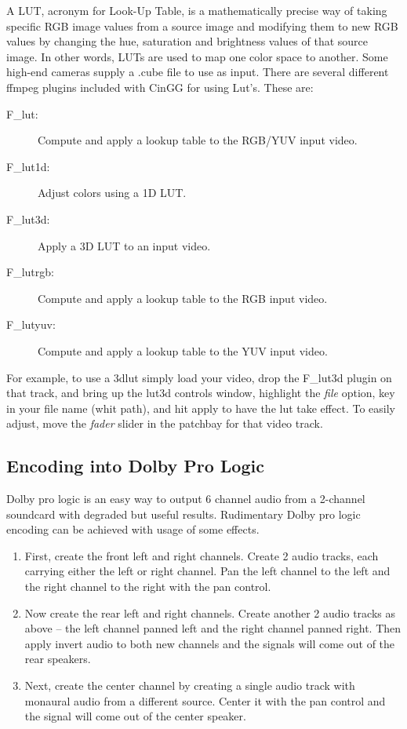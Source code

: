 A LUT, acronym for Look-Up Table, is a mathematically precise way of taking specific RGB image values from a source image and modifying them to new RGB values by changing the hue, saturation and brightness values of that source image. In other words, LUTs are used to map one color space to another.  Some high-end cameras supply a .cube file to use as input. There are several different ffmpeg plugins included with CinGG for using Lut's.  These are:

\begin{description}
	\item[F\_lut:] Compute and apply a lookup table to the RGB/YUV input video.
	\item[F\_lut1d:] Adjust colors using a 1D LUT.
	\item[F\_lut3d:] Apply a 3D LUT to an input video.
	\item[F\_lutrgb:] Compute and apply a lookup table to the RGB input video.
	\item[F\_lutyuv:] Compute and apply a lookup table to the YUV input video.
\end{description}

For example, to use a 3dlut simply load your video, drop the F\_lut3d plugin on that track, and bring up the lut3d controls window, highlight the \textit{file} option, key in your file name (whit path), and hit apply to have the lut take effect.  To easily adjust, move the \textit{fader} slider in the patchbay for that video track.

\subsection{Encoding into Dolby Pro Logic}%
\label{sub:encoding_dolby_pro_logic}

Dolby pro logic is an easy way to output 6 channel audio from a 2-channel soundcard with degraded but useful results. Rudimentary Dolby pro logic encoding can be achieved with usage of some effects.

\begin{enumerate}
	\item First, create the front left and right channels. Create 2 audio tracks, each carrying either the left or
	right channel. Pan the left channel to the left and the right channel to the right with the pan control.
	\item Now create the rear left and right channels. Create another 2 audio tracks as above -- the left channel
	panned left and the right channel panned right. Then apply invert audio to both new channels and
	the signals will come out of the rear speakers.
	\item Next, create the center channel by creating a single audio track with monaural audio from a
	different source. Center it with the pan control and the signal will come out of the center speaker.
\end{enumerate}


